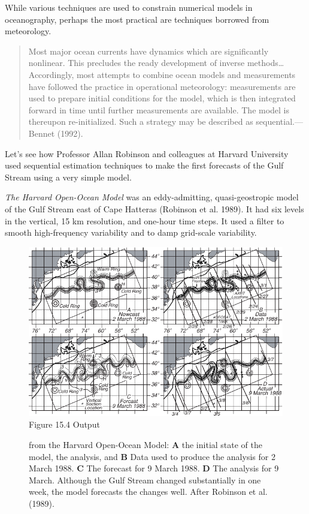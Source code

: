 While various techniques are used to constrain numerical models in
oceanography, perhaps the most practical are techniques borrowed from
meteorology.
\begin{quote} \small
Most major ocean currents have dynamics which are significantly
nonlinear. This precludes the ready development of inverse
methods\dots Accord\-ing\-ly, most attempts to combine ocean models
and measurements have followed the practice in operational
meteorology: measurements are used to prepare initial conditions for
the model, which is then integrated forward in time until further
measurements are available. The model is thereupon
re-initialized. Such a strategy may be described as
sequential.---Bennet (1992).
\end{quote}

Let's see how Professor Allan Robinson and colleagues at Harvard
University used sequential estimation techniques to make the first forecasts of the Gulf
Stream using a very simple model.

\textit{The Harvard Open-Ocean Model} was an eddy-admitting,
quasi-geostrop\-ic mod\-el of the Gulf Stream east of Cape Hatteras (Robinson et al. 1989). It
had six levels in the vertical, 15 km resolution, and one-hour time
steps. It used a filter to smooth high-frequency variability and to
damp grid-scale variability.

\begin{figure}[t!]
\includegraphics{pics/harvardmodelR}
\footnotesize
Figure 15.4 Output \rule{0mm}{4ex} from the Harvard Open-Ocean Model:
\textbf{A} the initial state of the model, the analysis, and
\textbf{B} Data used to produce the analysis for 2 March
1988. \textbf{C} The forecast for 9 March 1988. \textbf{D} The
analysis for 9 March. Although the Gulf Stream changed substantially in one week, the model
forecasts the changes well. After Robinson et al. (1989).
\label{fig:harvardmodel}
\vspace{-3ex}
\end{figure}

